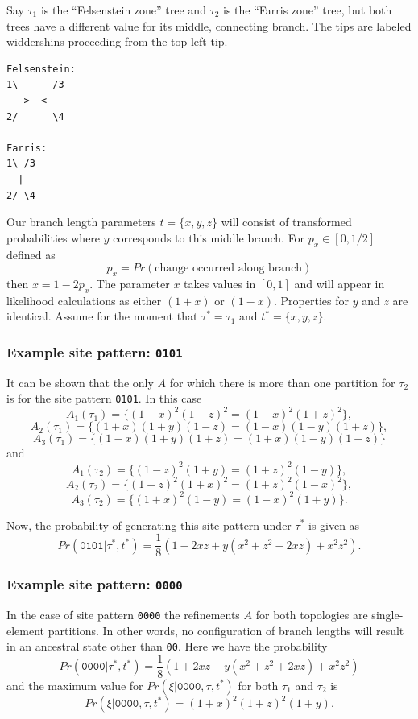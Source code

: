 \documentclass[a4paper]{article}
\begin{document}

Say $\tau_1$ is the ``Felsenstein zone'' tree and $\tau_2$ is the ``Farris zone'' tree, but both trees have a different value for its middle, connecting branch.
The tips are labeled widdershins proceeding from the top-left tip.
\begin{verbatim}
Felsenstein:
1\      /3
   >--< 
2/      \4

Farris:
1\ /3
  | 
2/ \4
\end{verbatim}
Our branch length parameters $t=\{x,y,z\}$ will consist of transformed probabilities where $y$ corresponds to this middle branch.
For $p_x\in[0,1/2]$ defined as
$$p_x = Pr(\mbox{change occurred along branch})$$
then $x = 1-2p_x$.
The parameter $x$ takes values in $[0,1]$ and will appear in likelihood calculations as either $(1+x)$ or $(1-x)$.
Properties for $y$ and $z$ are identical.
Assume for the moment that $\tau^*=\tau_1$ and $t^*=\{x,y,z\}$.

\subsubsection{Example site pattern: \texttt{0101}}

It can be shown that the only $A$ for which there is more than one partition for $\tau_2$ is for the site pattern \texttt{0101}.
In this case
$$A_1(\tau_1) = \{(1+x)^2(1-z)^2 = (1-x)^2(1+z)^2\},$$
$$A_2(\tau_1) = \{(1+x)(1+y)(1-z) = (1-x)(1-y)(1+z)\},$$
$$A_3(\tau_1) = \{(1-x)(1+y)(1+z) = (1+x)(1-y)(1-z)\}$$
and
$$A_1(\tau_2) = \{(1-z)^2(1+y) = (1+z)^2(1-y)\},$$
$$A_2(\tau_2) = \{(1-z)^2(1+x)^2 = (1+z)^2(1-x)^2\},$$
$$A_3(\tau_2) = \{(1+x)^2(1-y) = (1-x)^2(1+y)\}.$$

Now, the probability of generating this site pattern under $\tau^*$ is given as
$$
Pr(\texttt{0101} | \tau^*, t^*) = \frac{1}{8}(1-2xz+y(x^2+z^2-2xz)+x^2z^2).
$$

\subsubsection{Example site pattern: \texttt{0000}}

In the case of site pattern \texttt{0000} the refinements $A$ for both topologies are single-element partitions.
In other words, no configuration of branch lengths will result in an ancestral state other than \texttt{00}.
Here we have the probability
$$
Pr(\texttt{0000} | \tau^*, t^*) = \frac{1}{8}(1+2xz+y(x^2+z^2+2xz)+x^2z^2)
$$
and the maximum value for $Pr(\xi | \texttt{0000}, \tau, t^*)$ for both $\tau_1$ and $\tau_2$ is
$$
Pr(\xi | \texttt{0000}, \tau, t^*) = (1+x)^2(1+z)^2(1+y).
$$
\end{document}
